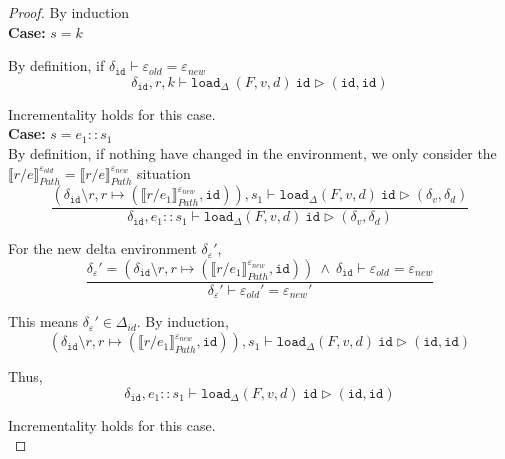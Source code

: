 \documentclass[10pt,twoside,a4paper]{article}
\theoremstyle{theorem}
\theoremstyle{lemma}
\theoremstyle{property}
\theoremstyle{definition}
\theoremstyle{assumption}
\def\id{\mathtt{id}}
\begin{document}
\begin{proof}
	By induction\\

	\textbf{Case: } $s = k$
		
		By definition, if $\delta_{\id} \vdash \varepsilon_{old} = \varepsilon_{new}$
		\begin{displaymath}
			\delta_{\id}, r, k \vdash \mathtt{load}_\Delta~ (F,v,d)~ \id \rhd (\id, \id)
		\end{displaymath}

		Incrementality holds for this case.\\

	\textbf{Case: } $s = e_1::s_1$\\
	
		By definition, if nothing have changed in the environment, we only consider the $\llbracket r/e \rrbracket^{\varepsilon_{old}}_{Path} = \llbracket r/e \rrbracket^{\varepsilon_{new}}_{Path}$ situation
		\begin{displaymath}
		\frac
		{(\delta_{\id} \setminus r, r \mapsto (\llbracket r/e_1 \rrbracket^{\varepsilon_{new}}_{Path}, \id)) , s_1 \vdash \mathtt{load}_\Delta (F,v,d)~ \id \rhd (\delta_v,\delta_d)}
		{\delta_{\id}, e_1::s_1 \vdash \mathtt{load}_\Delta (F,v,d)~ \id \rhd (\delta_v,\delta_d)}
		\end{displaymath}

		For the new delta environment $\delta_\varepsilon'$,
		\begin{displaymath}
		\frac{
			\delta_\varepsilon' = (\delta_{\id} \setminus r, r \mapsto (\llbracket r/e_1 \rrbracket^{\varepsilon_{new}}_{Path}, \id)) 
			~\wedge~ \delta_{\id} \vdash \varepsilon_{old} = \varepsilon_{new}
		}
		{	\delta_\varepsilon' \vdash \varepsilon_{old}' = \varepsilon_{new}' }
		\end{displaymath}

		This means $\delta_\varepsilon' \in \Delta_{id}$. By induction,
		\begin{displaymath}
		(\delta_{\id} \setminus r, r \mapsto (\llbracket r/e_1 \rrbracket^{\varepsilon_{new}}_{Path}, \id)) , s_1 \vdash \mathtt{load}_\Delta (F,v,d)~ \id \rhd (\id,\id)
		\end{displaymath}

		Thus, 
		\begin{displaymath}
		\delta_{\id}, e_1::s_1 \vdash \mathtt{load}_\Delta (F,v,d)~ \id \rhd (\id,\id)
		\end{displaymath}
		
		Incrementality holds for this case.\\


\end{proof}
\end{document}
